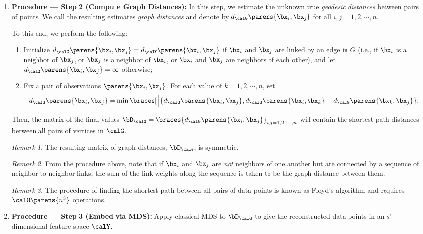 \documentclass[12pt]{article}
\begin{document}
\begin{enumerate}[label=\textbf{\arabic*.}]
	\item \textbf{Procedure --- Step 2 (Compute Graph Distances):} In this step, we estimate the unknown true \emph{geodesic distances} between pairs of points. 
	We call the resulting estimates \emph{graph distances} and denote by $d_{\calG} \parens{\bx_i, \bx_j}$ for all $i, j = 1, 2, \cdots, n$. 
	
	To this end, we perform the following: 
	\begin{enumerate}
		\item Initialize $d_{\calG} \parens{\bx_i, \bx_j} = d_{\calX} \parens{\bx_i, \bx_j}$ if $\bx_i$ and $\bx_j$ are linked by an edge in $G$ (i.e., if $\bx_i$ is a neighbor of $\bx_j$, or $\bx_j$ is a neighbor of $\bx_i$, or $\bx_i$ and $\bx_j$ are neighbors of each other), and let $d_{\calG} \parens{\bx_i, \bx_j} = \infty$ otherwise; 
		\item Fix a pair of observations $\parens{\bx_i, \bx_j}$. For each value of $k = 1, 2, \cdots, n$, set 
		\begin{align*}
			d_{\calG} \parens{\bx_i, \bx_j} = \min \braces[\Big]{d_{\calG} \parens{\bx_i, \bx_j}, d_{\calG} \parens{\bx_i, \bx_k} + d_{\calG} \parens{\bx_k, \bx_j}}. 
		\end{align*}
	\end{enumerate}
	Then, the matrix of the final values $\bD_{\calG} = \braces{d_{\calG} \parens{\bx_i, \bx_j}}_{i,j=1,2,\cdots,n}$ will contain the shortest path distances between all pairs of vertices in $\calG$. 
	
	\textit{Remark 1.} The resulting matrix of graph distances, $\bD_{\calG}$, is symmetric. 
	
	\textit{Remark 2.} From the procedure above, note that if $\bx_i$ and $\bx_j$ are \emph{not} neighbors of one another but are connected by a sequence of neighbor-to-neighbor links, the sum of the link weights along the sequence is taken to be the graph distance between them. 
	
	\textit{Remark 3.} The procedure of finding the shortest path between all pairs of data points is known as Floyd's algorithm and requires $\calO \parens{n^3}$ operations. 
	
	\item \textbf{Procedure --- Step 3 (Embed via MDS):} Apply classical MDS to $\bD_{\calG}$ to give the reconstructed data points in an $s'$-dimensional feature space $\calY$. 
	

\end{enumerate}
\end{document}
